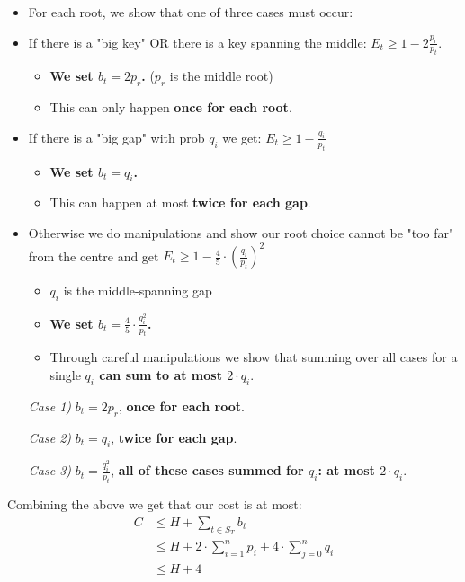 \documentclass{beamer}
\theoremstyle{plain}
\begin{document}
\begin{frame}

\begin{itemize}
\item<1-> For each root, we show that one of three cases must occur:

\item<2->[\textit{Case 1)}] If there is a "big key" OR there is a key spanning the middle: $E_t \geq 1-2 \frac{p_r}{p_t}$. 
\begin{itemize}
\item \textbf{We set $b_t = 2p_r$.} ($p_r$ is the middle root)
\item This can only happen \textbf{once for each root}.
\end{itemize}

\item<3->[\textit{Case 2)}] If there is a "big gap" with prob $q_i$ we get: $E_t \geq 1-\frac{q_i}{p_t}$ 
\begin{itemize}
\item \textbf{We set $b_t = q_i$.}
\item This can happen at most \textbf{twice for each gap}.
\end{itemize}

\item<4->[\textit{Case 3)}] Otherwise we do manipulations and show our root choice cannot be "too far" from the centre and get $E_t \geq 1 - \frac{4}{5} \cdot \left( \frac{q_i}{p_t}\right)^2$
\begin{itemize}
\item $q_i$ is the middle-spanning gap
\item \textbf{We set $b_t = \frac{4}{5} \cdot \frac{q_i^2}{p_t}$.}
\item Through careful manipulations we show that summing over all cases for a single \textbf{$q_i$ can sum to at most $2\cdot q_i$}.
\end{itemize} 
\end{itemize}
\end{frame}

\begin{frame}{}
\begin{itemize}
\item[\textit{Case 1)}] $b_t = 2p_r$, \textbf{once for each root}.

\item[\textit{Case 2)}]$b_t = q_i$, \textbf{twice for each gap}.

\item[\textit{Case 3)}] $b_t = \frac{q_i^2}{p_t}$, \textbf{all of these cases summed for $q_i$: at most $2\cdot q_i$}.
\end{itemize}

Combining the above we get that our cost is at most:
\begin{align*}
C &\leq H + \sum_{t \in S_T} b_t \\
 &\leq H + 2 \cdot \sum_{i=1}^{n} p_i + 4 \cdot \sum_{j=0}^{n} q_i \\
 &\leq H + 4
\end{align*}
\end{frame}
\end{document}
